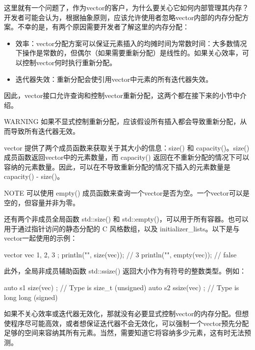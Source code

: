 这里就有一个问题了，作为vector的客户，为什么要关心它如何内部管理其内存？开发者可能会认为，根据抽象原则，应该允许使用者忽略vector内部的内存分配方案。不幸的是，有两个原因需要开发者了解这里的内存分配：

\begin{itemize}
\item
效率：vector分配方案可以保证元素插入的均摊时间为常数时间：大多数情况下操作是常数的，但偶尔（如果需要重新分配）是线性的。如果关心效率，可以控制vector何时执行重新分配。

\item
迭代器失效：重新分配会使引用vector中元素的所有迭代器失效。
\end{itemize}

因此，vector接口允许查询和控制vector重新分配，这两个都在接下来的小节中介绍。

\begin{myWarning}{WARNING}
如果不显式控制重新分配，应该假设所有插入都会导致重新分配，从而导致所有迭代器无效。
\end{myWarning}


vector 提供了两个成员函数来获取关于其大小的信息：size() 和 capacity()。size() 成员函数返回vector中的元素数量，而 capacity() 返回在不重新分配的情况下可以容纳的元素数量。因此，可以在不导致重新分配的情况下插入的元素数量是 capacity() - size()。

\begin{myNotic}{NOTE}
可以使用 empty() 成员函数来查询一个vector是否为空。一个vector可以是空的，但容量并非为零。
\end{myNotic}

还有两个非成员全局函数 std::size() 和 std::empty()，可以用于所有容器。也可以用于通过指针访问的静态分配的 C 风格数组，以及 initializer\_lists。以下是与vector一起使用的示例：

\begin{cpp}
vector vec { 1, 2, 3 };
println("{}", size(vec)); // 3
println("{}", empty(vec)); // false
\end{cpp}

此外，全局非成员辅助函数 std::ssize() 返回大小作为有符号的整数类型。例如：

\begin{cpp}
auto s1 { size(vec) }; // Type is size_t (unsigned)
auto s2 { ssize(vec) }; // Type is long long (signed)
\end{cpp}


如果不关心效率或迭代器无效化，那就没有必要显式控制vector的内存分配。但想使程序尽可能高效，或者想保证迭代器不会无效化，可以强制一个vector预先分配足够的空间来容纳其所有元素。当然，需要知道它将容纳多少元素，这有时无法预测。

